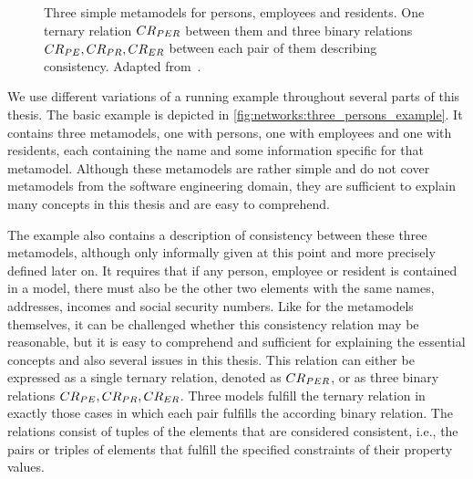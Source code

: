 
\begin{figure}
    \centering
    
    \caption[Three metamodels with exemplary consistency relations]{Three simple metamodels for persons, employees and residents. One ternary relation $\consistencyrelation{CR}{PER}$ between them and three binary relations $\consistencyrelation{CR}{PE}, \consistencyrelation{CR}{PR}, \consistencyrelation{CR}{ER}$ between each pair of them describing consistency. Adapted from~.}
    \label{fig:networks:three_persons_example}
\end{figure}

We use different variations of a running example throughout several parts of this thesis.
The basic example is depicted in \autoref{fig:networks:three_persons_example}.
It contains three metamodels, one with persons, one with employees and one with residents, each containing the name and some information specific for that metamodel.
Although these metamodels are rather simple and do not cover metamodels from the software engineering domain, they are sufficient to explain many concepts in this thesis and are easy to comprehend.

The example also contains a description of consistency between these three metamodels, although only informally given at this point and more precisely defined later on.
It requires that if any person, employee or resident is contained in a model, there must also be the other two elements with the same names, addresses, incomes and social security numbers.
Like for the metamodels themselves, it can be challenged whether this consistency relation may be reasonable, but it is easy to comprehend and sufficient for explaining the essential concepts and also several issues in this thesis.
This relation can either be expressed as a single ternary relation, denoted as $\consistencyrelation{CR}{PER}$, or as three binary relations $\consistencyrelation{CR}{PE}, \consistencyrelation{CR}{PR}, \consistencyrelation{CR}{ER}$.
Three models fulfill the ternary relation in exactly those cases in which each pair fulfills the according binary relation.
The relations consist of tuples of the elements that are considered consistent, i.e., the pairs or triples of elements that fulfill the specified constraints of their property values.

